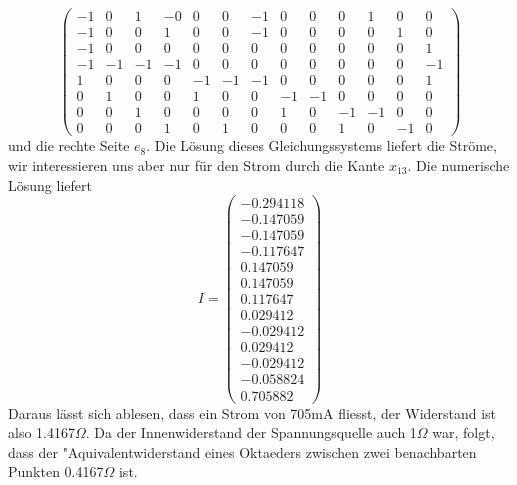 \begin{loesung}
\[\begin{pmatrix}
  -1&  0&  1& -0&  0&  0& -1&  0&  0&  0&  1&  0&  0\\
  -1&  0&  0&  1&  0&  0& -1&  0&  0&  0&  0&  1&  0\\
  -1&  0&  0&  0&  0&  0&  0&  0&  0&  0&  0&  0&  1\\
  -1& -1& -1& -1&  0&  0&  0&  0&  0&  0&  0&  0& -1\\
   1&  0&  0&  0& -1& -1& -1&  0&  0&  0&  0&  0&  1\\
   0&  1&  0&  0&  1&  0&  0& -1& -1&  0&  0&  0&  0\\
   0&  0&  1&  0&  0&  0&  0&  1&  0& -1& -1&  0&  0\\
   0&  0&  0&  1&  0&  1&  0&  0&  0&  1&  0& -1&  0
\end{pmatrix}
\]
%
%
und die rechte Seite $e_8$. Die Lösung dieses Gleichungssystems liefert die
Ströme, wir interessieren uns aber nur für den Strom durch die
Kante $x_{13}$. Die numerische Lösung liefert
\[
I=\begin{pmatrix}
  -0.294118\\
  -0.147059\\
  -0.147059\\
  -0.117647\\
   0.147059\\
   0.147059\\
   0.117647\\
   0.029412\\
  -0.029412\\
   0.029412\\
  -0.029412\\
  -0.058824\\
   0.705882
\end{pmatrix}
\]
Daraus lässt sich ablesen, dass ein Strom von 705mA fliesst,
der Widerstand ist also 1.4167$\Omega$. Da der Innenwiderstand
der Spannungsquelle auch 1$\Omega$ war, folgt, dass der "Aquivalentwiderstand
eines Oktaeders zwischen zwei benachbarten Punkten 0.4167$\Omega$ ist.
\end{loesung}


